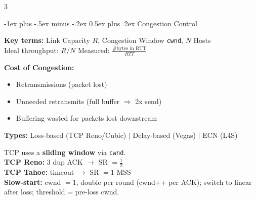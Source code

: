 \documentclass[10pt,landscape]{article}
\makeatletter
\renewcommand{\section}{\@startsection{section}{1}{0mm}%
                                {-1ex plus -.5ex minus -.2ex}%
                                {0.5ex plus .2ex}%
                                {\normalfont\large\bfseries}}
\makeatother
\begin{document}
\begin{multicols}{3}

\section{Congestion Control}

\textbf{Key terms:} Link Capacity $R$, Congestion Window \texttt{cwnd}, $N$ Hosts\\
Ideal throughput: $R/N$ \quad Measured: $\frac{\text{\#bytes in RTT}}{RTT}$

\textbf{Cost of Congestion:}
\begin{itemize}\setlength\itemsep{0pt}
  \item Retransmissions (packet lost)
  \item Unneeded retransmits (full buffer $\Rightarrow$ 2x send)
  \item Buffering wasted for packets lost downstream
\end{itemize}

\textbf{Types:} Loss-based (TCP Reno/Cubic) $|$ Delay-based (Vegas) $|$ ECN (L4S)

TCP uses a \textbf{sliding window} via \texttt{cwnd}.\\
\textbf{TCP Reno:} 3 dup ACK $\rightarrow$ SR $= \tfrac{1}{2}$\\
\textbf{TCP Tahoe:} timeout $\rightarrow$ SR $= 1$ MSS\\
\textbf{Slow-start:} cwnd $= 1$, double per round (cwnd++ per ACK); switch to linear after loss; threshold = pre-loss cwnd.

\end{multicols}
\end{document}
